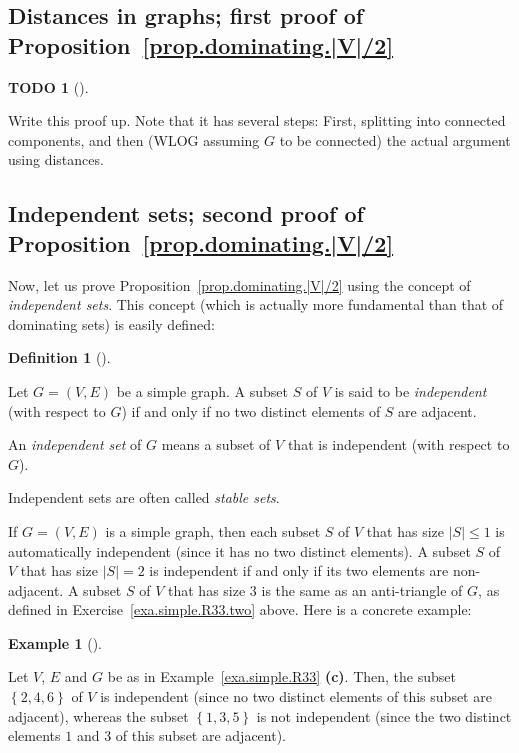\documentclass[numbers=enddot,12pt,final,onecolumn,notitlepage]{scrartcl}%
\theoremstyle{definition}
\newtheorem{defi}[theo]{Definition}
\newenvironment{definition}[1][]
{\begin{defi}[#1]\begin{leftbar}}
{\end{leftbar}\end{defi}}
\newtheorem{exam}[theo]{Example}
\newenvironment{example}[1][]
{\begin{exam}[#1]\begin{leftbar}}
{\end{leftbar}\end{exam}}
\newtheorem{quest}[theo]{TODO}
\newenvironment{todo}[1][]
{\begin{quest}[#1]\begin{leftbar}}
{\end{leftbar}\end{quest}}
\newcommand{\set}[1]{\left\{ #1 \right\}}
\newcommand{\abs}[1]{\left| #1 \right|}
\newcommand{\tup}[1]{\left( #1 \right)}
\begin{document}
\subsection{\label{subsect.dominating.part1}Distances in graphs;
first proof of Proposition~\ref{prop.dominating.|V|/2}}

\begin{todo}
 Write this proof up. Note that it has several steps: First,
 splitting into connected components, and then (WLOG assuming $G$
 to be connected) the actual argument using distances.
\end{todo}

\subsection{\label{subsect.dominating.part2}Independent sets;
second proof of Proposition~\ref{prop.dominating.|V|/2}}

Now, let us prove Proposition~\ref{prop.dominating.|V|/2} using the
concept of \textit{independent sets}. This concept (which is
actually more fundamental than that of dominating sets) is easily
defined:

\begin{definition} \label{def.dominating.indset}
Let $G = \tup{V, E}$ be a simple graph. A subset $S$ of $V$ is
said to be \textit{independent} (with respect to $G$) if and only
if no two distinct elements of $S$ are adjacent.

An \textit{independent set} of $G$ means a subset of $V$ that
is independent (with respect to $G$).
\end{definition}

Independent sets are often called \textit{stable sets}.

If $G = \tup{V, E}$ is a simple graph, then each subset $S$ of
$V$ that has size $\abs{S} \leq 1$ is automatically independent
(since it has no two distinct elements). A subset $S$ of $V$ that
has size $\abs{S} = 2$ is independent if and only if its two
elements are non-adjacent. A subset $S$ of $V$ that has size $3$
is the same as an anti-triangle of $G$, as defined in
Exercise~\ref{exa.simple.R33.two} above.
Here is a concrete example:

\begin{example}
Let $V$, $E$ and $G$ be as in Example~\ref{exa.simple.R33}
\textbf{(c)}. Then, the subset $\set{2, 4, 6}$ of $V$ is
independent (since no two distinct elements of this subset are
adjacent), whereas the subset $\set{1, 3, 5}$ is not
independent (since the two distinct elements $1$ and $3$ of
this subset are adjacent).
\end{example}
\end{document}
